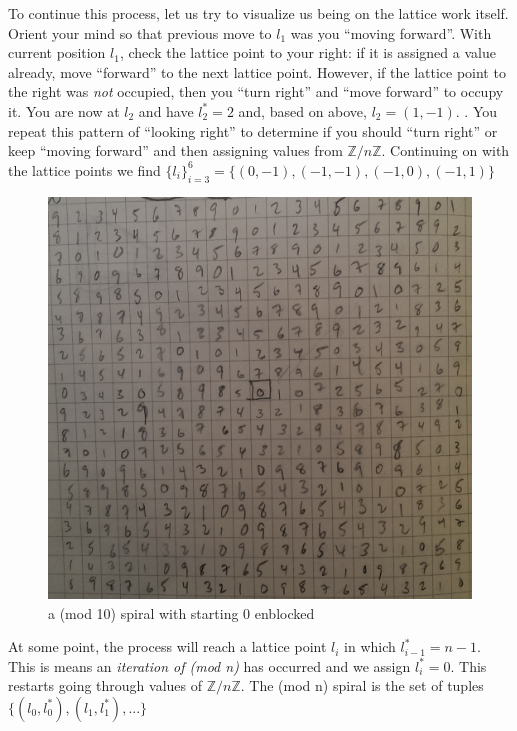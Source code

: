 \documentclass[11pt]{amsart}
\theoremstyle{mydef}
\begin{document}
To continue this process, let us try to visualize us being on the lattice work itself. Orient your mind so that previous move to $l_1$ was you ``moving forward''. With current position $l_1$, check the lattice point to your right: if it is assigned a value already, move ``forward'' to the next lattice point. However, if the lattice point to the right was \emph{not} occupied, then you ``turn right'' and ``move forward'' to occupy it. You are now at $l_2$ and have $l^*_2 = 2$ and, based on above, $l_2 = (1, -1)$. . You repeat this pattern of ``looking right'' to determine if you should ``turn right'' or keep ``moving forward'' and then assigning values from $\mathbb{Z}/n\mathbb{Z}$. Continuing on with the lattice points we find $\{ l_i \}^{6}_{i=3} = \{  (0, -1), (-1, -1), (-1, 0), (-1, 1) \}$

\begin{figure}[h]
\centering
\includegraphics[scale=0.3]{mod10.png}
\caption{a (mod 10) spiral with starting 0 enblocked}
\label{fig:mod10}
\end{figure}

At some point, the process will reach a lattice point $l_i$ in which $l^*_{i-1} = n-1$. This is means an \textit{iteration of (mod n)} has occurred and we assign $l^*_i = 0$. This restarts going through values of $\mathbb{Z}/n\mathbb{Z}$. The (mod n) spiral is the set of tuples $\{ (l_0, l^*_0), (l_1, l^*_1), ... \}$ 
\end{document}
